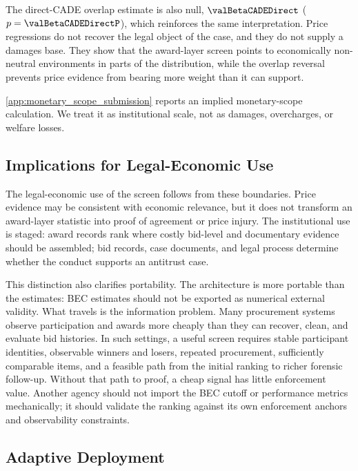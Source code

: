 The direct-CADE overlap estimate is also null,
$\valBetaCADEDirect$ ($p=\valBetaCADEDirectP$), which reinforces
the same interpretation. Price regressions do not recover the
legal object of the case, and they do not supply a damages base.
They show that the award-layer screen points to economically
non-neutral environments in parts of the distribution, while the
overlap reversal prevents price evidence from bearing more
weight than it can support.

\ref{app:monetary_scope_submission} reports an implied
monetary-scope calculation. We treat it as institutional scale,
not as damages, overcharges, or welfare losses.

\subsection{Implications for Legal-Economic Use}
\label{sec:legal_economic_use_submission}

The legal-economic use of the screen follows from these
boundaries. Price evidence may be consistent with economic
relevance, but it does not transform an award-layer statistic
into proof of agreement or price injury. The institutional use is staged:
award records rank where costly bid-level and documentary
evidence should be assembled; bid records, case documents, and
legal process determine whether the conduct supports an antitrust
case.

This distinction also clarifies portability. The architecture is
more portable than the estimates: BEC estimates should not be
exported as numerical external validity. What travels is the
information problem. Many
procurement systems observe participation and awards more cheaply
than they can recover, clean, and evaluate bid histories. In such
settings, a useful screen requires stable participant identities,
observable winners and losers, repeated procurement, sufficiently
comparable items, and a feasible path from the initial ranking to
richer forensic follow-up. Without that path to proof, a cheap
signal has little enforcement value.
Another agency should not import the BEC cutoff or performance
metrics mechanically; it should validate the ranking against its
own enforcement anchors and observability constraints.

\subsection{Adaptive Deployment}
\label{sec:adaptive_deployment_submission}

